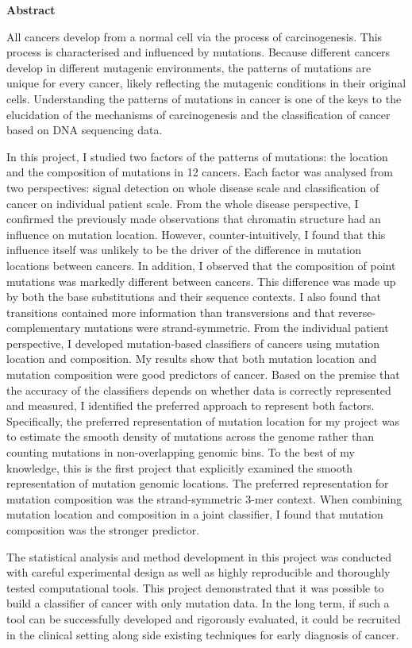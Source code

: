 \newpage
\thispagestyle{plain}
\begin{center}
\huge
\textbf{Abstract}
\end{center}
  
\normalsize
All cancers develop from a normal cell via the process of \gls{carcinogenesis}. This process is characterised and influenced by mutations. Because different cancers develop in different mutagenic environments, the patterns of mutations are unique for every cancer, likely reflecting the mutagenic conditions in their original cells. Understanding the patterns of mutations in cancer is one of the keys to the elucidation of the mechanisms of carcinogenesis and the classification of cancer based on DNA sequencing data. 

In this project, I studied two factors of the patterns of mutations: the location and the composition of mutations in 12 cancers. Each factor was analysed from two perspectives: signal detection on whole disease scale and classification of cancer on individual patient scale. From the whole disease perspective, I confirmed the previously made observations that chromatin structure had an influence on mutation location. However, counter-intuitively, I found that this influence itself was unlikely to be the driver of the difference in mutation locations between cancers. In addition, I observed that the composition of point mutations was markedly different between cancers. This difference was made up by both the base substitutions and their sequence contexts. I also found that \glspl{transition} contained more information than \glspl{transversion} and that reverse-complementary mutations were strand-symmetric. From the individual patient perspective, I developed mutation-based classifiers of cancers using mutation location and composition. My results show that both mutation location and mutation composition were good predictors of cancer. Based on the premise that the accuracy of the classifiers depends on whether data is correctly represented and measured, I identified the preferred approach to represent both factors. Specifically, the preferred representation of mutation location for my project was to estimate the smooth density of mutations across the genome rather than counting mutations in non-overlapping genomic bins. To the best of my knowledge, this is the first project that explicitly examined the smooth representation of mutation genomic locations. The preferred representation for mutation composition was the strand-symmetric 3-mer context. When combining mutation location and composition in a joint classifier, I found that mutation composition was the stronger predictor. 

The statistical analysis and method development in this project was conducted with careful experimental design as well as highly reproducible and thoroughly tested computational tools. This project demonstrated that it was possible to build a classifier of cancer with only mutation data. In the long term, if such a tool can be successfully developed and rigorously evaluated, it could be recruited in the clinical setting along side existing techniques for early diagnosis of cancer.   

